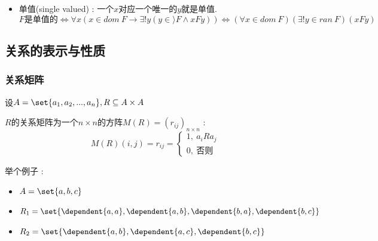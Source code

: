{{{{\begin{itemize}
{\begin{itemize}
{                    $F$是单根的 $\Leftrightarrow \forall y(y \in ran\ F \to \exists! x(x \in dom\ F \land xFy)) \Leftrightarrow (\forall y \in ran\ F)(\exists! x \in dom\ F)(xFy)$

                    \begin{itemize}
                      \item $\exists!$表示"存在唯一的"
                      \item $\forall x (x \in A \to B(x))$缩写为$(\forall x \in A)B(x)$
                      \item $\exists x (x \in A \land B(x))$缩写为$(\exists x \in A)B(x)$
                    \end{itemize}
                    }
              \item {
                    单值(single valued) : 一个$x$对应一个唯一的$y$就是单值.
                    $$
                      \mbox{$F$是单值的} \Leftrightarrow \forall x(x \in dom\ F \to \exists! y (y \in \rangle F \land xFy)) \Leftrightarrow (\forall x \in dom\ F)(\exists! y \in ran\ F)(xFy)
                    $$
                    }
            \end{itemize}
            }
    \end{itemize}
  }%

}%

\subsection{关系的表示与性质}{

  \subsubsection{关系矩阵}{
    设$A = \set{a_1,a_2,...,a_n},R \subseteq A \times A$

    $R$的关系矩阵为一个$n \times n$的方阵$M(R) = (r_{ij})_{n \times n}$ : $$
      M(R)(i,j) = r_{ij} = \begin{cases}
        1,\ a_iRa_j \\
        0,\ \mbox{否则}
      \end{cases}
    $$

    举个例子 : \begin{itemize}
      \item $A = \set{a,b,c}$
      \item $R_1 = \set{\dependent{a,a},\dependent{a,b},\dependent{b,a},\dependent{b,c}}$
      \item $R_2 = \set{\dependent{a,b},\dependent{a,c},\dependent{b,c}}$
    \end{itemize}

}}}}
